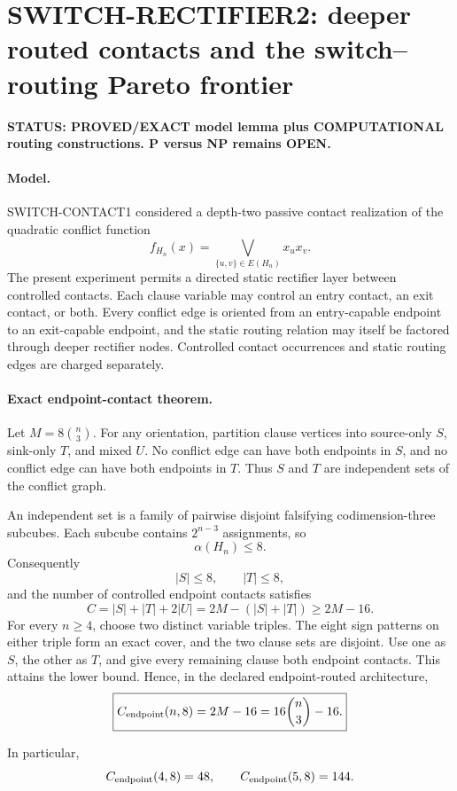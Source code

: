 \section*{SWITCH-RECTIFIER2: deeper routed contacts and the switch--routing Pareto frontier}

\textbf{STATUS: PROVED/EXACT model lemma plus COMPUTATIONAL routing constructions. P versus NP remains OPEN.}

\paragraph{Model.}
SWITCH-CONTACT1 considered a depth-two passive contact realization of the quadratic
conflict function
\[
f_{H_n}(x)=\bigvee_{\{u,v\}\in E(H_n)}x_ux_v.
\]
The present experiment permits a directed static rectifier layer between controlled contacts.
Each clause variable may control an entry contact, an exit contact, or both. Every conflict
edge is oriented from an entry-capable endpoint to an exit-capable endpoint, and the static
routing relation may itself be factored through deeper rectifier nodes. Controlled contact
occurrences and static routing edges are charged separately.

\paragraph{Exact endpoint-contact theorem.}
Let \(M=8\binom n3\). For any orientation, partition clause vertices into source-only \(S\),
sink-only \(T\), and mixed \(U\). No conflict edge can have both endpoints in \(S\), and no
conflict edge can have both endpoints in \(T\). Thus \(S\) and \(T\) are independent sets
of the conflict graph.

An independent set is a family of pairwise disjoint falsifying codimension-three subcubes.
Each subcube contains \(2^{n-3}\) assignments, so
\[
\alpha(H_n)\le 8.
\]
Consequently
\[
|S|\le8,\qquad |T|\le8,
\]
and the number of controlled endpoint contacts satisfies
\[
C=|S|+|T|+2|U|
=2M-(|S|+|T|)
\ge2M-16.
\]
For every \(n\ge4\), choose two distinct variable triples. The eight sign patterns on either
triple form an exact cover, and the two clause sets are disjoint. Use one as \(S\), the other
as \(T\), and give every remaining clause both endpoint contacts. This attains the lower
bound. Hence, in the declared endpoint-routed architecture,
\[
\boxed{
C_{\rm endpoint}(n,8)
=
2M-16
=
16\binom n3-16.
}
\]

In particular,
\[
C_{\rm endpoint}(4,8)=48,\qquad
C_{\rm endpoint}(5,8)=144.
\]

